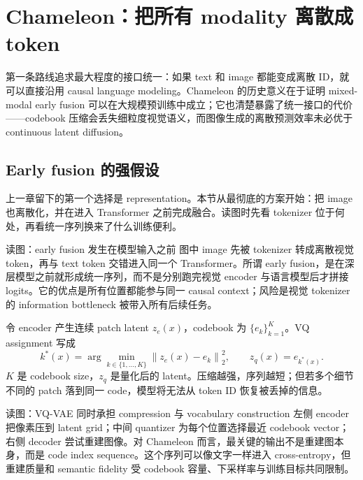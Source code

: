 \section{Chameleon：把所有 modality 离散成 token}

第一条路线追求最大程度的接口统一：如果 text 和 image 都能变成离散 ID，就可以直接沿用 causal language modeling。Chameleon 的历史意义在于证明 mixed-modal early fusion 可以在大规模预训练中成立；它也清楚暴露了统一接口的代价——codebook 压缩会丢失细粒度视觉语义，而图像生成的离散预测效率未必优于 continuous latent diffusion。

\subsection{Early fusion 的强假设}

上一章留下的第一个选择是 representation。本节从最彻底的方案开始：把 image 也离散化，并在进入 Transformer 之前完成融合。读图时先看 tokenizer 位于何处，再看统一序列换来了什么训练便利。


\begin{knowledgebox}{读图：early fusion 发生在模型输入之前}
图中 image 先被 tokenizer 转成离散视觉 token，再与 text token 交错进入同一个 Transformer。所谓 early fusion，是在深层模型之前就形成统一序列，而不是分别跑完视觉 encoder 与语言模型后才拼接 logits。它的优点是所有位置都能参与同一 causal context；风险是视觉 tokenizer 的 information bottleneck 被带入所有后续任务。
\end{knowledgebox}

令 encoder 产生连续 patch latent $z_e(x)$，codebook 为 $\{e_k\}_{k=1}^{K}$。VQ assignment 写成
$$
k^*(x)=\arg\min_{k\in\{1,\ldots,K\}}\left\|z_e(x)-e_k\right\|_2^2,
\qquad z_q(x)=e_{k^*(x)}.
$$
$K$ 是 codebook size，$z_q$ 是量化后的 latent。压缩越强，序列越短；但若多个细节不同的 patch 落到同一 code，模型将无法从 token ID 恢复被丢掉的信息。


\begin{knowledgebox}{读图：VQ-VAE 同时承担 compression 与 vocabulary construction}
左侧 encoder 把像素压到 latent grid；中间 quantizer 为每个位置选择最近 codebook vector；右侧 decoder 尝试重建图像。对 Chameleon 而言，最关键的输出不是重建图本身，而是 code index sequence。这个序列可以像文字一样进入 cross-entropy，但重建质量和 semantic fidelity 受 codebook 容量、下采样率与训练目标共同限制。
\end{knowledgebox}

